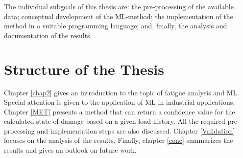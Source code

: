 The individual subgoals of this thesis are: the pre-processing of the available data; conceptual development of the ML-method; the implementation of the method in a suitable programming language; and, finally, the analysis and documentation of the results.

\section{Structure of the Thesis}
Chapter \ref{chap2} gives an introduction to the topic of fatigue analysis and ML. Special attention is given to the application of ML in industrial applications. Chapter \ref{MET} presents a method that can return a confidence value for the calculated state-of-damage based on a given load history. All the required pre-processing and implementation steps are also discussed. Chapter \ref{Validation} focuses on the analysis of the results. Finally, chapter \ref{conc} summarizes the results and gives an outlook on future work.

\afterpage{\null\newpage}
